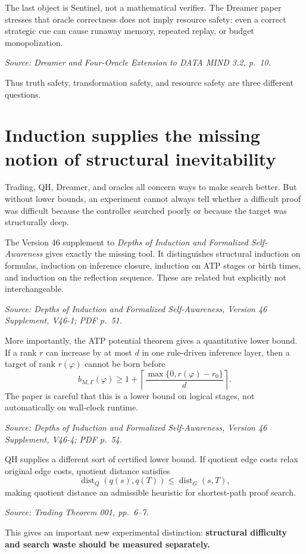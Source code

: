 \documentclass[11pt]{article}
\newcommand{\src}[1]{\par\smallskip\noindent\textit{Source: #1}\normalsize}
\newcommand{\dist}{\operatorname{dist}}
\begin{document}
The last object is Sentinel, not a mathematical verifier. The Dreamer paper stresses that oracle correctness does not imply resource safety: even a correct strategic cue can cause runaway memory, repeated replay, or budget monopolization.
\src{\emph{Dreamer and Four-Oracle Extension to DATA MIND 3.2}, p.~10.}

Thus truth safety, transformation safety, and resource safety are three different questions.

\section{Induction supplies the missing notion of structural inevitability}

Trading, QH, Dreamer, and oracles all concern ways to make search better. But without lower bounds, an experiment cannot always tell whether a difficult proof was difficult because the controller searched poorly or because the target was structurally deep.

The Version 46 supplement to \emph{Depths of Induction and Formalized Self-Awareness} gives exactly the missing tool. It distinguishes structural induction on formulas, induction on inference closure, induction on ATP stages or birth times, and induction on the reflection sequence. These are related but explicitly not interchangeable.
\src{\emph{Depths of Induction and Formalized Self-Awareness}, Version 46 Supplement, V46-1; PDF p.~51.}

More importantly, the ATP potential theorem gives a quantitative lower bound. If a rank $r$ can increase by at most $d$ in one rule-driven inference layer, then a target of rank $r(\varphi)$ cannot be born before
\[
b_{M,\Gamma}(\varphi)
\ge
1+
\left\lceil
\frac{\max\{0,r(\varphi)-r_0\}}{d}
\right\rceil.
\]
The paper is careful that this is a lower bound on logical stages, not automatically on wall-clock runtime.
\src{\emph{Depths of Induction and Formalized Self-Awareness}, Version 46 Supplement, V46-4; PDF p.~54.}

QH supplies a different sort of certified lower bound. If quotient edge costs relax original edge costs, quotient distance satisfies
\[
\dist_Q(q(s),q(T))\le \dist_G(s,T),
\]
making quotient distance an admissible heuristic for shortest-path proof search.
\src{\emph{Trading Theorem 001}, pp.~6--7.}

This gives an important new experimental distinction: \textbf{structural difficulty and search waste should be measured separately.}
\end{document}
